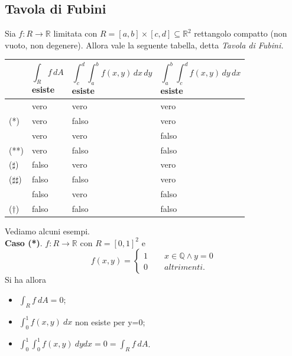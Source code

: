 \documentclass[10pt]{article}
\theoremstyle{plain}
\theoremstyle{definition}
\begin{document}
\subsection{Tavola di Fubini}
Sia $f: R \to \mathbb{R}$ limitata con $R=[a,b]\times[c,d]\subseteq \mathbb{R}^2$ rettangolo compatto (non vuoto, non degenere). Allora vale la seguente tabella, detta \textit{Tavola di Fubini.}
{\centering
\begin{tabular}{p{}p{}|p{}|p{}}
& $$\int_R f \,dA$$ \qquad \quad esiste        & $$\int_c^d \int_a^b f(x,y)\,dx\,dy$$ \qquad \qquad \qquad esiste        &   $$\int_a^b \int_c^d f(x,y)\,dy\,dx$$ \qquad \qquad \qquad esiste      \\
\hline
& \centerline{vero}& \centerline{vero}&\centerline{vero}\\
(*)& \centerline{vero}& \centerline{falso}& \centerline{vero}\\
& \centerline{vero}& \centerline{vero}& \centerline{falso}\\
(**)& \centerline{vero}& \centerline{falso}& \centerline{falso}\\
($\sharp$)& \centerline{falso}& \centerline{vero}& \centerline{vero}\\
($\sharp\sharp$)& \centerline{falso}& \centerline{falso}& \centerline{vero}\\
& \centerline{falso}& \centerline{vero}& \centerline{falso}\\
($\dagger$)& \centerline{falso}& \centerline{falso}& \centerline{falso}\\
\end{tabular}
\par }
\bigskip
Vediamo alcuni esempi.
\\
\textbf{Caso (*)}.
$f:R\to\mathbb{R}$ con $R=[0,1]^2$ e
\begin{equation*}
  f(x,y)=
   \begin{cases}
   1\qquad x \in \mathbb{Q} \wedge y=0\\
   0 \qquad altrimenti.
   \end{cases}
\end{equation*}
Si ha allora \begin{itemize}
    \item $ \int_R f\ dA = 0 $;
    \item $ \int_0^1 f(x,y)\ dx$  non esiste per y=0;
    \item $ \int_0^1 \int_0^1 f(x,y)\ dydx = 0 = \int_R f\ dA$.
\end{itemize}
\bigskip
\bigskip
\end{document}
